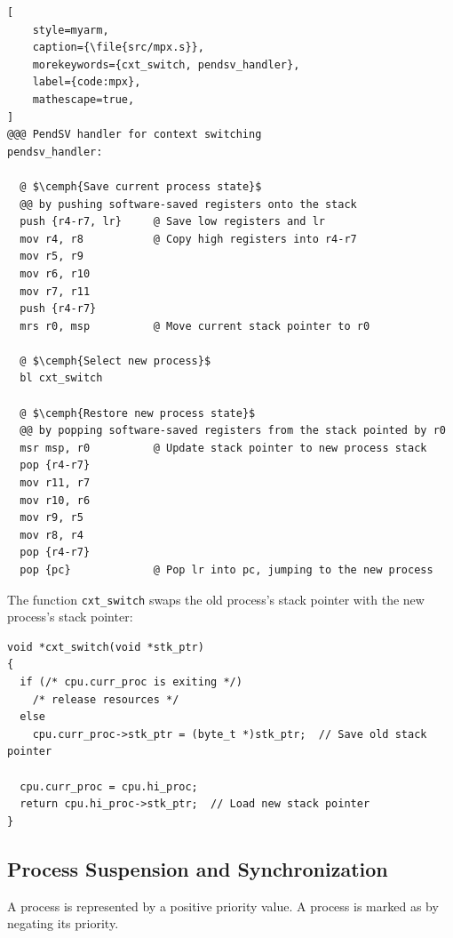 \begin{lstlisting}[
    style=myarm, 
    caption={\file{src/mpx.s}}, 
    morekeywords={cxt_switch, pendsv_handler},
    label={code:mpx},
    mathescape=true,
]
@@@ PendSV handler for context switching
pendsv_handler:

  @ $\cemph{Save current process state}$
  @@ by pushing software-saved registers onto the stack
  push {r4-r7, lr}     @ Save low registers and lr
  mov r4, r8           @ Copy high registers into r4-r7
  mov r5, r9
  mov r6, r10
  mov r7, r11
  push {r4-r7}
  mrs r0, msp          @ Move current stack pointer to r0

  @ $\cemph{Select new process}$
  bl cxt_switch        

  @ $\cemph{Restore new process state}$
  @@ by popping software-saved registers from the stack pointed by r0
  msr msp, r0          @ Update stack pointer to new process stack
  pop {r4-r7}
  mov r11, r7
  mov r10, r6
  mov r9, r5
  mov r8, r4
  pop {r4-r7}
  pop {pc}             @ Pop lr into pc, jumping to the new process
\end{lstlisting}

\ifsubmission\newpage\fi
The function \lstinline[style=myagc]|cxt_switch| swaps the old process's stack pointer
with the new process’s stack pointer:

\begin{lstlisting}[style=myagc, caption={\file{src/core/sched.cpp}}, linebackgroundcolor={\line{6} \lines{8}{9}}]
void *cxt_switch(void *stk_ptr)
{
  if (/* cpu.curr_proc is exiting */)
    /* release resources */
  else
    cpu.curr_proc->stk_ptr = (byte_t *)stk_ptr;  // Save old stack pointer

  cpu.curr_proc = cpu.hi_proc;
  return cpu.hi_proc->stk_ptr;  // Load new stack pointer
}
\end{lstlisting}


\subsection{Process Suspension and Synchronization}

\begin{emptythm}
    A  process is represented by a positive priority value. A process
    is marked as  by negating its priority.
\end{emptythm}

